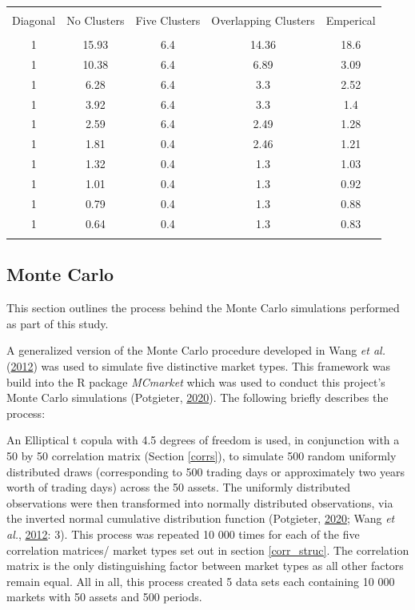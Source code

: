 \documentclass[11pt,preprint, authoryear]{elsarticle}
\let\origtable\table
\let\endorigtable\endtable
\renewenvironment{table}[1][2] {
    \expandafter\origtable\expandafter[H]
} {
    \endorigtable
}
\numberwithin{equation}{section}
\numberwithin{figure}{section}
\numberwithin{table}{section}
\begin{document}
\begin{table}[!htbp] \centering 
  \caption{Eigenvalues} 
  \label{eigens} 
\begin{tabular}{@{\extracolsep{5pt}} ccccc} 
\\[-1.8ex]\hline 
\hline \\[-1.8ex] 
Diagonal & No Clusters & Five Clusters & Overlapping Clusters & Emperical \\ 
\hline \\[-1.8ex] 
1 & 15.93 & 6.4 & 14.36 & 18.6 \\ 
1 & 10.38 & 6.4 & 6.89 & 3.09 \\ 
1 & 6.28 & 6.4 & 3.3 & 2.52 \\ 
1 & 3.92 & 6.4 & 3.3 & 1.4 \\ 
1 & 2.59 & 6.4 & 2.49 & 1.28 \\ 
1 & 1.81 & 0.4 & 2.46 & 1.21 \\ 
1 & 1.32 & 0.4 & 1.3 & 1.03 \\ 
1 & 1.01 & 0.4 & 1.3 & 0.92 \\ 
1 & 0.79 & 0.4 & 1.3 & 0.88 \\ 
1 & 0.64 & 0.4 & 1.3 & 0.83 \\ 
\hline \\[-1.8ex] 
\end{tabular} 
\end{table}

\hypertarget{monte-carlo}{%
\subsection{\texorpdfstring{Monte Carlo
\label{mc}}{Monte Carlo }}\label{monte-carlo}}

This section outlines the process behind the Monte Carlo simulations
performed as part of this study.

A generalized version of the Monte Carlo procedure developed in Wang
\emph{et al.} (\protect\hyperlink{ref-wang2012}{2012}) was used to
simulate five distinctive market types. This framework was build into
the R package \emph{MCmarket} which was used to conduct this project's
Monte Carlo simulations (Potgieter,
\protect\hyperlink{ref-MCmarket}{2020}). The following briefly describes
the process:

An Elliptical t copula with 4.5 degrees of freedom is used, in
conjunction with a 50 by 50 correlation matrix (Section \ref{corrs}), to
simulate 500 random uniformly distributed draws (corresponding to 500
trading days or approximately two years worth of trading days) across
the 50 assets. The uniformly distributed observations were then
transformed into normally distributed observations, via the inverted
normal cumulative distribution function (Potgieter,
\protect\hyperlink{ref-MCmarket}{2020}; Wang \emph{et al.},
\protect\hyperlink{ref-wang2012}{2012}: 3). This process was repeated 10
000 times for each of the five correlation matrices/ market types set
out in section \ref{corr_struc}. The correlation matrix is the only
distinguishing factor between market types as all other factors remain
equal. All in all, this process created 5 data sets each containing 10
000 markets with 50 assets and 500 periods.
\end{document}
